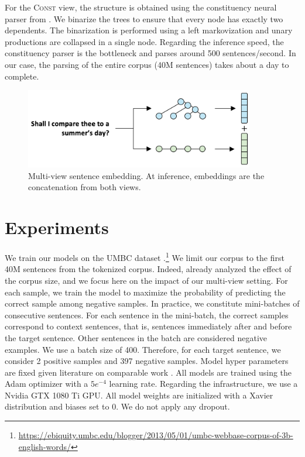 For the \textsc{Const} view, the structure is obtained using the constituency neural parser from \textcite{klein_18}. We binarize the trees to ensure that every node has exactly two dependents. The binarization is performed using a left markovization \parencite{klein_2003} and unary productions are collapsed in a single node. Regarding the inference speed, the constituency parser is the bottleneck and parses around 500 sentences/second. In our case, the parsing of the entire corpus (40M sentences) takes about a day to complete.

\begin{figure}[!htb]
\begin{center}
\includegraphics[width=10cm]{images/contrastive-inf.png}
\end{center}
\caption{Multi-view sentence embedding. At inference, embeddings are the concatenation from both views.}
\end{figure}

\section{Experiments}

We train our models on the UMBC dataset \parencite{han_13}.\footnote{\url{https://ebiquity.umbc.edu/blogger/2013/05/01/umbc-webbase-corpus-of-3b-english-words/}} We limit our corpus to the first 40M sentences from the tokenized corpus. Indeed, \textcite{logeswaran_18} already analyzed the effect of the corpus size, and we focus here on the impact of our multi-view setting. For each sample, we train the model to maximize the probability of predicting the correct sample among negative samples. In practice, we constitute mini-batches of consecutive sentences. For each sentence in the mini-batch, the correct samples correspond to context sentences, that is, sentences immediately after and before the target sentence. Other sentences in the batch are considered negative examples. We use a batch size of 400. Therefore, for each target sentence, we consider 2 positive samples and 397 negative samples. Model hyper parameters are fixed given literature on comparable work \parencite{tai_15, logeswaran_18}. All models are trained using the Adam optimizer with a $5e^{-4}$ learning rate. Regarding the infrastructure, we use a Nvidia GTX 1080 Ti GPU. All model weights are initialized with a Xavier distribution and biases set to 0. We do not apply any dropout. 

